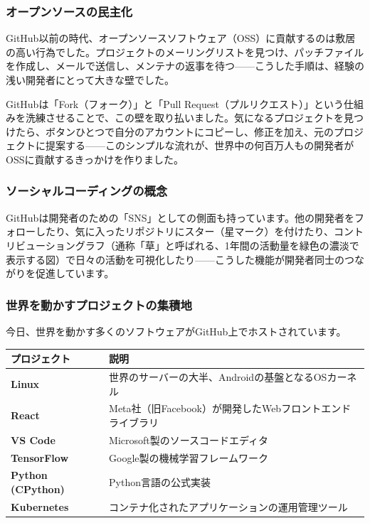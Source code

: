 \subsubsection{オープンソースの民主化}

GitHub以前の時代、オープンソースソフトウェア（OSS）に貢献するのは敷居の高い行為でした。プロジェクトのメーリングリストを見つけ、パッチファイルを作成し、メールで送信し、メンテナの返事を待つ——こうした手順は、経験の浅い開発者にとって大きな壁でした。

GitHubは「Fork（フォーク）」と「Pull Request（プルリクエスト）」という仕組みを洗練させることで、この壁を取り払いました。気になるプロジェクトを見つけたら、ボタンひとつで自分のアカウントにコピーし、修正を加え、元のプロジェクトに提案する——このシンプルな流れが、世界中の何百万人もの開発者がOSSに貢献するきっかけを作りました。

\subsubsection{ソーシャルコーディングの概念}

GitHubは開発者のための「SNS」としての側面も持っています。他の開発者をフォローしたり、気に入ったリポジトリにスター（星マーク）を付けたり、コントリビューショングラフ（通称「草」と呼ばれる、1年間の活動量を緑色の濃淡で表示する図）で日々の活動を可視化したり——こうした機能が開発者同士のつながりを促進しています。

\subsubsection{世界を動かすプロジェクトの集積地}

今日、世界を動かす多くのソフトウェアがGitHub上でホストされています。

\begin{table}[htbp]
\centering
\begin{tabular}{lp{10cm}}
\hline
\textbf{プロジェクト} & \textbf{説明} \\
\hline
\textbf{Linux} & 世界のサーバーの大半、Androidの基盤となるOSカーネル \\
\textbf{React} & Meta社（旧Facebook）が開発したWebフロントエンドライブラリ \\
\textbf{VS Code} & Microsoft製のソースコードエディタ \\
\textbf{TensorFlow} & Google製の機械学習フレームワーク \\
\textbf{Python (CPython)} & Python言語の公式実装 \\
\textbf{Kubernetes} & コンテナ化されたアプリケーションの運用管理ツール \\
\hline
\end{tabular}
\end{table}

